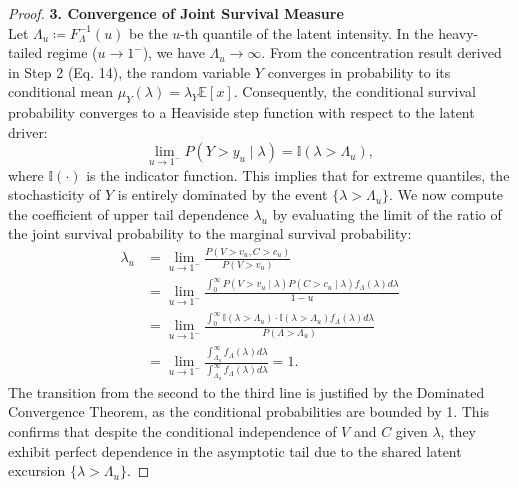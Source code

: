 \documentclass[sigconf, anonymous, review]{acmart}
\begin{document}
\begin{proof}
\textbf{3. Convergence of Joint Survival Measure}\\
Let $\Lambda_u \coloneqq F_\Lambda^{-1}(u)$ be the $u$-th quantile of the latent intensity. In the heavy-tailed regime ($u \to 1^-$), we have $\Lambda_u \to \infty$. 
From the concentration result derived in Step 2 (Eq. 14), the random variable $Y$ converges in probability to its conditional mean $\mu_Y(\lambda) = \lambda_Y \mathbb{E}[x]$. Consequently, the conditional survival probability converges to a Heaviside step function with respect to the latent driver:
\begin{equation}
    \lim_{u \to 1^-} P(Y > y_u \mid \lambda) = \mathbb{I}(\lambda > \Lambda_u),
\end{equation}
where $\mathbb{I}(\cdot)$ is the indicator function. This implies that for extreme quantiles, the stochasticity of $Y$ is entirely dominated by the event $\{\lambda > \Lambda_u\}$.
We now compute the coefficient of upper tail dependence $\lambda_u$ by evaluating the limit of the ratio of the joint survival probability to the marginal survival probability:
\begin{equation}
\label{eqn:joint_survival_limit}
\begin{aligned}
    \lambda_u &= \lim_{u \to 1^-} \frac{P(V > v_u, C > c_u)}{P(V > v_u)} \\
    &= \lim_{u \to 1^-} \frac{\int_0^\infty P(V > v_u \mid \lambda) P(C > c_u \mid \lambda) f_\Lambda(\lambda) d\lambda}{1 - u} \\
    &= \lim_{u \to 1^-} \frac{\int_0^\infty \mathbb{I}(\lambda > \Lambda_u) \cdot \mathbb{I}(\lambda > \Lambda_u) f_\Lambda(\lambda) d\lambda}{P(\Lambda > \Lambda_u)} \\
    &= \lim_{u \to 1^-} \frac{\int_{\Lambda_u}^\infty f_\Lambda(\lambda) d\lambda}{\int_{\Lambda_u}^\infty f_\Lambda(\lambda) d\lambda} = 1.
\end{aligned}
\end{equation}
The transition from the second to the third line is justified by the Dominated Convergence Theorem, as the conditional probabilities are bounded by 1. 
This confirms that despite the conditional independence of $V$ and $C$ given $\lambda$, they exhibit perfect dependence in the asymptotic tail due to the shared latent excursion $\{\lambda > \Lambda_u\}$.


\end{proof}
\end{document}
